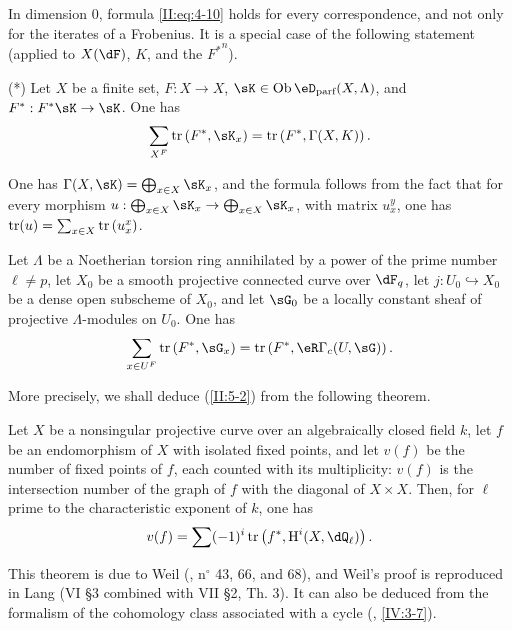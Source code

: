 In dimension $0$, formula \eqref{II:eq:4-10} holds for every correspondence,
and not only for the iterates of a Frobenius. It is a special case of the
following statement (applied to $X(\dF)$, $K$, and the ${F^*}^n$).

(*) Let $X$ be a finite set, $F:X\to X$,
$\sK\in\ob\eD_\text{parf}(X,\Lambda)$, and $F^*:F^* \sK\to \sK$. One has
\[
  \sum_{X^F} \tr\left(F^*,\sK_x\right) = \tr\left(F^*,\Gamma(X,K)\right) \text{.}
\]

One has $\Gamma(X,\sK)=\bigoplus_{x\in X} \sK_x$, and the formula follows
from the fact that for every morphism
$u:\bigoplus_{x\in X} \sK_x\to \bigoplus_{x\in X} \sK_x$, with matrix
$u_x^y$, one has $\operatorname{tr}(u)=\sum_{x\in X} \operatorname{tr}\left(u_x^x\right)$.






\begin{lemma_}\label{II:5-2}
Let $\Lambda$ be a Noetherian torsion ring annihilated by a power of the prime
number $\ell\ne p$, let $X_0$ be a smooth projective connected curve over
$\dF_q$, let $j:U_0\hookrightarrow X_0$ be a dense open subscheme of $X_0$,
and let $\sG_0$ be a locally constant sheaf of projective
$\Lambda$-modules on $U_0$. One has
\[
  \sum_{x\in U^F} \tr\left(F^*,\sG_x\right) = \tr\left(F^*,\eR\Gamma_c(U,\sG)\right) \text{.}
\]
\end{lemma_}

More precisely, we shall deduce (\ref{II:5-2}) from the following theorem.






\begin{theorem_}\label{II:5-3}
Let $X$ be a nonsingular projective curve over an algebraically closed field
$k$, let $f$ be an endomorphism of $X$ with isolated fixed points, and let
$v(f)$ be the number of fixed points of $f$, each counted with its
multiplicity: $v(f)$ is the intersection number of the graph of $f$ with the
diagonal of $X\times X$. Then, for $\ell$ prime to the characteristic
exponent of $k$, one has
\[
  v(f) = \sum (-1)^i \tr\left(f^*,\h^i(X,\dQ_\ell)\right) \text{.}
\]
\end{theorem_}

This theorem is due to Weil (\cite{we48}, n$^\circ$ 43, 66, and 68), and Weil's
proof is reproduced in Lang \cite{la83} (VI \S3 combined with VII \S2,
Th. 3). It can also be deduced from the formalism of the cohomology class
associated with a cycle (, \ref{IV:3-7}).






